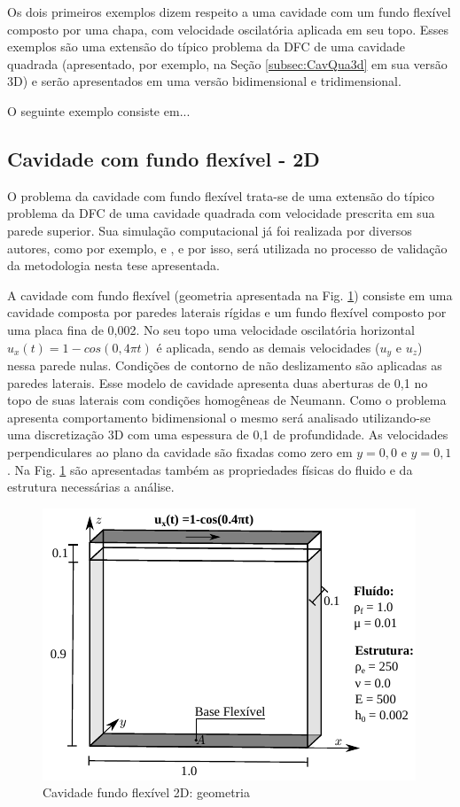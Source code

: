 \documentclass[tese_patricia]{subfiles}
\begin{document}
Os dois primeiros exemplos dizem respeito a uma cavidade com um fundo flexível composto por uma chapa, com velocidade oscilatória aplicada em seu topo. Esses exemplos são uma extensão do típico problema da DFC de uma cavidade quadrada (apresentado, por exemplo, na Seção \ref{subsec:CavQua3d} em sua versão 3D) e serão apresentados em uma versão bidimensional e tridimensional.

O seguinte exemplo consiste em...

\subsection{Cavidade com fundo flexível - 2D}

O problema da cavidade com fundo flexível trata-se de uma extensão do típico problema da DFC de uma cavidade quadrada com velocidade prescrita em sua parede superior. Sua simulação computacional já foi realizada por diversos autores, como por exemplo,  e , e  por isso, será utilizada no processo de validação da metodologia nesta tese apresentada.

A cavidade com fundo flexível (geometria apresentada na Fig. \ref{fig:cavidadeFF2d:Geo}) consiste em uma cavidade composta por paredes laterais rígidas e um fundo flexível composto por uma placa fina de 0,002. No seu topo uma velocidade oscilatória horizontal $u_x(t)=1-cos(0,4 \pi t)$ é aplicada, sendo as demais velocidades ($u_y$ e $u_z$) nessa parede nulas. Condições de contorno de não deslizamento são aplicadas as paredes laterais. Esse modelo de cavidade apresenta duas aberturas de 0,1 no topo de suas laterais com condições homogêneas de Neumann. Como o problema apresenta comportamento bidimensional o mesmo será analisado utilizando-se uma discretização 3D com uma espessura de 0,1 de profundidade. As velocidades perpendiculares ao plano da cavidade são fixadas como zero em $y=0,0$ e $y=0,1$. Na Fig. \ref{fig:cavidadeFF2d:Geo} são apresentadas também as propriedades físicas do fluido e da estrutura necessárias a análise.

\begin{figure}[htb!]
	\centering 
	\includegraphics[scale=1.3,trim=0cm 0cm 0cm 0cm, clip=true]{Imagens/Cap7/cav2d.pdf}	
	\caption{Cavidade fundo flexível 2D: geometria}
	\label{fig:cavidadeFF2d:Geo}
\end{figure}
\end{document}
